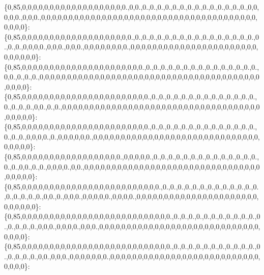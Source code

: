 \{0,85,0,0,0,0,0,0,0,0,0,0,0,0,0,0,0,0,0,0,0.,0,0.,0.,0.,0.,0.,0.,0.,0.,0.,0.,0.,0.,0.,0.,0.,0,0,0,0,0.,0,0,0.,0,0,0,0,0,0,0,0,0,0,0,0,0,0,0,0,0,0,0,0,0,0,0,0,0,0,0,0,0,0,0,0,0,0,0,0,0,0,0,0,0,0,0\}\+: \{0,85,0,0,0,0,0,0,0,0,0,0,0,0,0,0,0,0,0,0,0,0.,0.,0.,0.,0.,0.,0.,0.,0.,0.,0.,0.,0.,0.,0.,0.,0.,0.,0.,0.,0,0,0,0.,0,0,0.,0,0,0.,0,0,0,0,0,0,0,0.,0,0,0,0,0,0,0,0,0,0,0,0,0,0,0,0,0,0,0,0,0,0,0,0,0,0,0,0,0\}\+: \{0,85,0,0,0,0,0,0,0,0,0,0,0,0,0,0,0,0,0,0,0,0,0,0.,0.,0.,0.,0.,0.,0.,0.,0.,0.,0.,0.,0.,0.,0.,0.,0,0.,0.,0.,0.,0,0,0,0,0,0,0,0,0,0,0,0,0,0,0,0,0,0,0,0,0,0,0,0,0,0,0,0,0,0,0,0,0,0,0,0,0,0,0,0,0,0,0,0\}\+: \{0,85,0,0,0,0,0,0,0,0,0,0,0,0,0,0,0,0,0,0,0,0,0,0,0.,0.,0.,0.,0.,0.,0.,0.,0.,0.,0.,0.,0.,0.,0.,0.,0.,0.,0.,0,0.,0.,0.,0,0,0,0,0,0,0,0,0,0,0,0,0,0,0,0,0,0,0,0,0,0,0,0,0,0,0,0,0,0,0,0,0,0,0,0,0,0,0,0,0\}\+: \{0,85,0,0,0,0,0,0,0,0,0,0,0,0,0,0,0,0,0,0,0,0,0,0,0.,0.,0.,0.,0.,0.,0.,0.,0.,0.,0.,0.,0.,0.,0.,0.,0.,0.,0,0,0,0.,0.,0,0,0,0,0,0.,0,0,0,0,0,0,0,0,0,0,0,0,0,0,0,0,0,0,0,0,0,0,0,0,0,0,0,0,0,0,0,0,0,0,0\}\+: \{0,85,0,0,0,0,0,0,0,0,0,0,0,0,0,0,0,0,0,0.,0,0,0,0,0.,0.,0.,0.,0.,0.,0.,0.,0.,0.,0.,0.,0.,0.,0.,0.,0.,0,0.,0.,0.,0,0,0,0.,0,0.,0,0,0,0,0,0,0,0,0,0,0,0,0,0,0,0,0,0,0,0,0,0,0,0,0,0,0,0,0,0,0,0,0,0,0,0,0\}\+: \{0,85,0,0,0,0,0,0,0,0,0,0,0,0,0,0,0,0,0,0,0,0,0,0,0,0,0.,0.,0.,0.,0.,0.,0.,0.,0.,0.,0.,0.,0.,0.,0.,0.,0.,0.,0.,0,0.,0.,0,0,0.,0,0,0,0,0.,0,0,0,0.,0,0,0,0,0,0,0,0,0,0,0,0,0,0,0,0,0,0,0,0,0,0,0,0,0,0,0,0\}\+: \{0,85,0,0,0,0,0,0,0,0,0,0,0,0,0,0,0,0,0,0,0,0,0,0,0,0,0,0,0.,0.,0.,0.,0.,0.,0.,0.,0.,0.,0.,0.,0.,0.,0.,0.,0.,0,0,0.,0,0,0,0.,0,0,0.,0,0,0,0,0,0,0,0,0,0,0,0,0,0,0,0,0,0,0,0,0,0,0,0,0,0,0,0,0,0,0,0,0\}\+: \{0,85,0,0,0,0,0,0,0,0,0,0,0,0,0,0,0,0,0,0,0,0,0,0,0,0,0,0,0.,0.,0.,0.,0.,0.,0.,0.,0.,0.,0.,0.,0.,0.,0.,0.,0.,0,0.,0,0,0.,0,0,0,0,0,0,0.,0,0,0,0,0,0,0,0,0,0,0,0,0,0,0,0,0,0,0,0,0,0,0,0,0,0,0,0,0,0,0\}\+: 